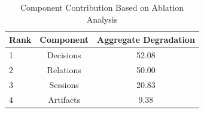 \begin{table}[htbp]
\centering
\caption{Component Contribution Based on Ablation Analysis}
\label{tab:crme-ablation-ranking}
\begin{tabular}{lcc}
\toprule
Rank & Component & Aggregate Degradation \\
\midrule
1 & Decisions & 52.08 \\
2 & Relations & 50.00 \\
3 & Sessions & 20.83 \\
4 & Artifacts & 9.38 \\
\bottomrule
\end{tabular}
\end{table}
